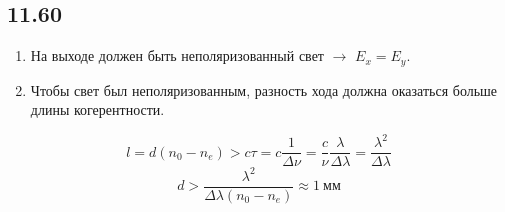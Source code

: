 \subsection*{11.60}
\begin{enumerate}
	\item На выходе должен быть неполяризованный свет $\rightarrow$ $E_x = E_y$.
	\item Чтобы свет был неполяризованным, разность хода должна оказаться больше длины когерентности.
\end{enumerate}
$$l = d(n_0 - n_e) > c \tau = c \frac{1}{\Delta \nu} = \frac{c}{\nu}\frac{\lambda}{\Delta \lambda} = \frac{\lambda^2}{\Delta \lambda}$$
$$d > \frac{\lambda^2}{\Delta \lambda (n_0 - n_e)} \approx 1 \ мм$$